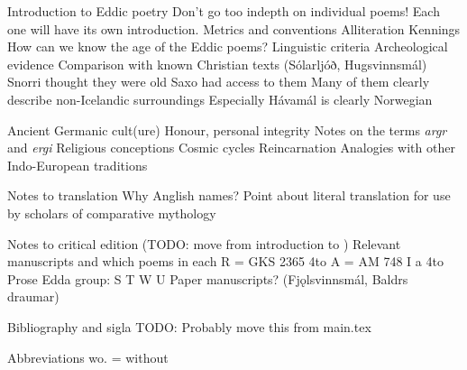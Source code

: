 Introduction to Eddic poetry
  Don't go too indepth on individual poems! Each one will have its own introduction.
  Metrics and conventions
    Alliteration
    Kennings
  How can we know the age of the Eddic poems?
    Linguistic criteria
    Archeological evidence
    Comparison with known Christian texts (Sólarljóð, Hugsvinnsmál)
    Snorri thought they were old
    Saxo had access to them
    Many of them clearly describe non-Icelandic surroundings
      Especially Hávamál is clearly Norwegian

Ancient Germanic cult(ure)
  Honour, personal integrity
  Notes on the terms \emph{argr} and \emph{ergi}
  Religious conceptions
    Cosmic cycles
    Reincarnation
    Analogies with other Indo-European traditions

Notes to translation
  Why Anglish names?
  Point about literal translation for use by scholars of comparative mythology

Notes to critical edition (TODO: move from introduction to \Voluspa)
  Relevant manuscripts and which poems in each
    R = GKS 2365 4to
    A = AM 748 I a 4to
    Prose Edda group:
    S
    T
    W
    U
    Paper manuscripts? (Fjǫlsvinnsmál, Baldrs draumar)
  
Bibliography and sigla
  TODO: Probably move this from main.tex

Abbreviations
  wo. = without
